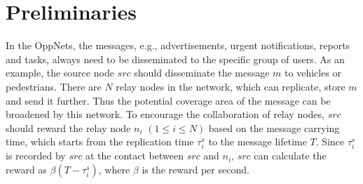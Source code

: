 \section{Preliminaries}
\label{sec:preli}
In the OppNets,
the messages, e.g., advertisements, urgent notifications, 
reports and tasks,
always need to be disseminated
to the specific group of users.
As an example, the source node $src$ 
should disseminate the message $m$
to vehicles or pedestrians.
There are $N$ relay nodes in the network, 
which can replicate, store $m$ and send it further.
Thus the potential coverage area of the message
can be broadened by this network.
To encourage the collaboration of relay nodes,
$src$ should reward the relay node $n_{i}$
$(1 \le i \le N)$ based on the message carrying time,
which starts from the replication time $\tau_{i}^{s}$
to the message lifetime $T$.
Since $\tau_{i}^{s}$ is recorded by $src$ 
at the contact between $src$ and $n_{i}$,
$src$ can calculate the reward 
as $\beta (T-\tau_{i}^{s})$, where $\beta$ is the reward per second.

